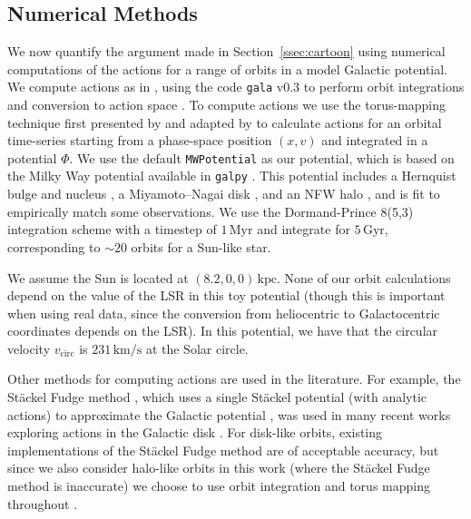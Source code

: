 \documentclass[twocolumn]{aastex62}
\newcommand{\kpc}{\text{kpc}}
\newcommand{\Myr}{\text{Myr}}
\newcommand{\Gyr}{\text{Gyr}}
\newcommand{\kms}{\text{km}/\text{s}}
\begin{document}
\subsection{Numerical Methods} \label{ssec:action_comp}
We now quantify the argument made in Section~\ref{ssec:cartoon} using
numerical computations of the actions for a range of orbits in a model
Galactic potential. We compute actions as in \citet{2018ApJ...867...31B},
using the code \texttt{gala} v0.3 to perform orbit integrations and conversion
to action space \citep{2017JOSS....2..388P,Price-Whelan:2018}. To compute
actions we use the torus-mapping technique first presented by
\citet{1990MNRAS.244..634M} and adapted by \citet{2014MNRAS.441.3284S} to
calculate actions for an orbital time-series starting from a phase-space
position $(x, v)$ and integrated in a potential $\Phi$. We use the default
\texttt{MWPotential} as our potential, which is based on the Milky Way
potential available in \texttt{galpy} \citep{2015ApJS..216...29B}. This
potential includes a Hernquist bulge and nucleus \citep{1990ApJ...356..359H},
a Miyamoto--Nagai disk \citep{1975PASJ...27..533M}, and an NFW halo
\citep{1997ApJ...490..493N}, and is fit to empirically match some
observations. We use the Dormand-Prince 8(5,3) integration scheme
\citep{Dormand80:integrator} with a timestep of $1\,\Myr$ and integrate for
$5\,\Gyr$, corresponding to $\sim 20$ orbits for a Sun-like star.

We assume the Sun is located at $(8.2, 0, 0)\,\kpc$. None of our orbit
calculations depend on the value of the LSR in this toy potential (though this
is important when using real data, since the conversion from heliocentric to
Galactocentric coordinates depends on the LSR). In this potential, we have
that the circular velocity $v_{\text{circ}}$ is $231\,\kms$ at the Solar
circle.

Other methods for computing actions are used in the literature. For example,
the St\"ackel Fudge method \citep{2016MNRAS.457.2107S}, which uses a single
St\"ackel potential (with analytic actions) to approximate the Galactic
potential \citep{1985MNRAS.216..273D, 2012MNRAS.426.1324B}, was used in many
recent works exploring actions in the Galactic disk
\citep[e.g.][]{2019MNRAS.484.3291T, 2018MNRAS.481.4093S, 2018arXiv180803278T}.
For disk-like orbits, existing implementations of the St\"ackel Fudge method
are of acceptable accuracy, but since we also consider halo-like orbits in
this work (where the St\"ackel Fudge method is inaccurate) we choose to use
orbit integration and torus mapping throughout \citep{2016MNRAS.457.2107S}.
\end{document}
